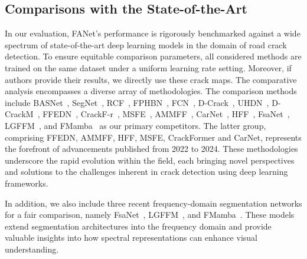 \documentclass[journal]{IEEEtran}
\begin{document}
\subsection{Comparisons with the State-of-the-Art}

In our evaluation, FANet's performance is rigorously benchmarked against a wide spectrum of state-of-the-art deep learning models in the domain of road crack detection. To ensure equitable comparison parameters, all considered methods are trained on the same dataset under a uniform learning rate setting. Moreover, if authors provide their results, we directly use these crack maps. The comparative analysis encompasses a diverse array of methodologies. The comparison methods include BASNet~\cite{DBLP:conf/cvpr/QinZHGDJ19}, 
SegNet~\cite{DBLP:journals/corr/BadrinarayananK15}, 
RCF~\cite{DBLP:conf/cvpr/LiuCHWB17}, 
FPHBN~\cite{DBLP:journals/tits/YangZYPML20}, 
FCN~\cite{DBLP:conf/cvpr/LongSD15}, 
D-Crack~\cite{DBLP:journals/tip/ZouZLQWW19}, 
UHDN~\cite{DBLP:journals/corr/abs-2007-00477}, 
D-CrackM~\cite{DBLP:journals/ijon/LiuYLXL19}, 
FFEDN~\cite{DBLP:journals/tits/LiuZXZL22}, 
CrackF-r~\cite{DBLP:journals/tits/LiuYMMK23}, 
MSFE~\cite{DBLP:journals/tiv/ZhouQJ23}, 
AMMFF~\cite{DBLP:journals/tits/QuCWYL22}, 
CarNet~\cite{DBLP:journals/tits/LiYMWWTQ24}, 
HFF~\cite{DBLP:journals/tits/QuWWJ22}, 
FsaNet~\cite{DBLP:journals/tip/ZhangPG23}, 
LGFFM~\cite{11129883TMI}, 
and FMamba~\cite{DBLP:journals/tim/LiuLLWZS25} as our primary competitors.
The latter group, comprising FFEDN, AMMFF, HFF, MSFE, CrackFormer and CarNet, represents the forefront of advancements published from 2022 to 2024. These methodologies underscore the rapid evolution within the field, each bringing novel perspectives and solutions to the challenges inherent in crack detection using deep learning frameworks.

%
%

\par

In addition, we also include three recent frequency-domain segmentation networks for a fair comparison, 
namely FsaNet~\cite{DBLP:journals/tip/ZhangPG23}, 
LGFFM~\cite{11129883TMI}, 
and FMamba~\cite{DBLP:journals/tim/LiuLLWZS25}. 
These models extend segmentation architectures into the frequency domain and provide valuable insights into how spectral representations can enhance visual understanding.
\end{document}
